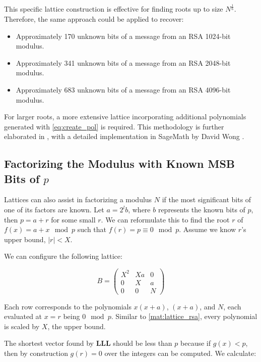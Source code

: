 \documentclass[a4paper,12pt]{report}
\begin{document}
This specific lattice construction is effective for finding roots up to size $N^{\frac{1}{6}}$. Therefore, the same approach could be applied to recover:

\begin{itemize}
    \item Approximately 170 unknown bits of a message from an RSA 1024-bit modulus.
    \item Approximately 341 unknown bits of a message from an RSA 2048-bit modulus.
    \item Approximately 683 unknown bits of a message from an RSA 4096-bit modulus.
\end{itemize}

For larger roots, a more extensive lattice incorporating additional polynomials generated with \ref{eq:create_pol} is required.
This methodology is further elaborated in \cite{may2011}, with a detailed implementation in SageMath by David Wong \cite{wong2015}.

\subsection{Factorizing the Modulus with Known MSB Bits of $p$}

Lattices can also assist in factorizing a modulus $N$ if the most significant bits of one of its factors are known. Let $a = 2^lb$, where $b$ represents the known bits of $p$, then $p = a + r$ for some small $r$.
We can reformulate this to find the root $r$ of $f(x) = a + x \mod p$ such that $f(r) = p \equiv 0 \mod p$.
Assume we know $r$'s upper bound, $|r| < X$.

We can configure the following lattice:

\[
    B = 
    \begin{pmatrix}
        X^2 & Xa & 0 \\
        0 & X & a \\
        0 & 0 & N
    \end{pmatrix} 
\]

\vspace*{10px}

Each row corresponds to the polynomials $x(x + a)$, $(x + a)$, and $N$, each evaluated at $x = r$ being $0 \mod p$. Similar to \ref{mat:lattice_rsa}, every polynomial is scaled by $X$, the upper bound.

The shortest vector found by \textbf{LLL} should be less than $p$ because if $g(x) < p$, then by construction $g(r) = 0$ over the integers can be computed. We calculate:
\end{document}
